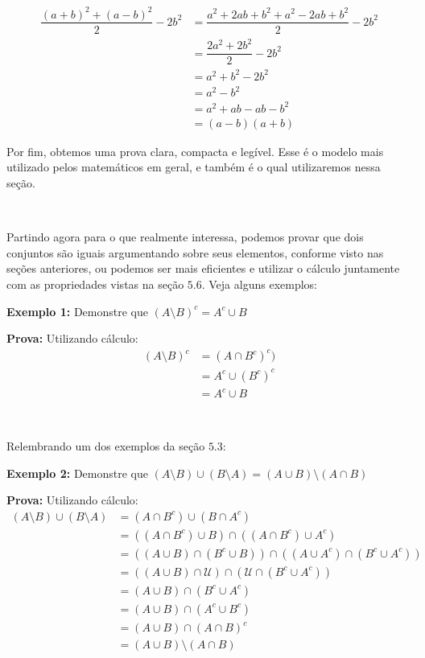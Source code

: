   \begin{equation*}
    \begin{aligned}
      \dfrac{(a+b)^2+(a-b)^2}{2}-2b^2 &= \dfrac{a^2+2ab+b^2+a^2-2ab+b^2}{2}-2b^2\\
      &= \dfrac{2a^2+2b^2}{2}-2b^2\\
      &= a^2+b^2-2b^2\\
      &= a^2-b^2\\
      &= a^2+ab-ab-b^2\\
      &= (a-b)(a+b)
    \end{aligned}
  \end{equation*}

  Por fim, obtemos uma prova clara, compacta e legível. Esse é o modelo mais utilizado pelos matemáticos em geral, e também é o qual utilizaremos nessa seção.

  $\qquad$

  Partindo agora para o que realmente interessa, podemos provar que dois conjuntos são iguais argumentando sobre seus elementos, conforme visto nas seções anteriores, ou podemos ser mais eficientes e utilizar o cálculo juntamente com as propriedades vistas na seção $5.6$. Veja alguns exemplos:

  \textbf{Exemplo 1:} Demonstre que $(A \setminus B)^c = A^c \cup B$

  \textbf{Prova:} Utilizando cálculo:
  \begin{equation*}
    \begin{aligned}
      (A \setminus B)^c &= (A \cap B^c)^c)\\
      &= A^c \cup (B^c)^c\\
      & = A^c \cup B
    \end{aligned}
  \end{equation*}

  $\qquad$

  Relembrando um dos exemplos da seção $5.3$:

  \textbf{Exemplo 2:} Demonstre que $(A \setminus B) \cup (B \setminus A) = (A \cup B) \setminus (A \cap B)$

  \textbf{Prova:} Utilizando cálculo:
  \begin{equation*}
    \begin{aligned}
      (A \setminus B) \cup (B \setminus A) &= (A \cap B^c) \cup (B \cap A^c)\\
      &= ((A \cap B^c) \cup B) \cap ((A \cap B^c) \cup A^c)\\
      &= ((A \cup B) \cap (B^c \cup B)) \cap ((A \cup A^c) \cap (B^c \cup A^c))\\
      &= ((A \cup B) \cap \mathcal U) \cap (\mathcal U \cap (B^c \cup A^c))\\
      &= (A \cup B) \cap (B^c \cup A^c)\\
      &= (A \cup B) \cap (A^c \cup B^c)\\
      &= (A \cup B) \cap (A \cap B)^c\\
      &= (A \cup B) \setminus (A \cap B)
    \end{aligned}
  \end{equation*}

